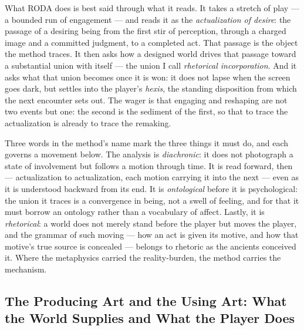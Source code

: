 \documentclass{article}
\begin{document}
What RODA does is best said through what it reads. It takes a stretch of play — a bounded run of engagement — and reads it as the \textit{actualization of desire}: the passage of a desiring being from the first stir of perception, through a charged image and a committed judgment, to a completed act. That passage is the object the method traces. It then asks how a designed world drives that passage toward a substantial union with itself — the union I call \textit{rhetorical incorporation}. And it asks what that union becomes once it is won: it does not lapse when the screen goes dark, but settles into the player's \textit{hexis}, the standing disposition from which the next encounter sets out. The wager is that engaging and reshaping are not two events but one: the second is the sediment of the first, so that to trace the actualization is already to trace the remaking.

Three words in the method's name mark the three things it must do, and each governs a movement below. The analysis is \textit{diachronic}: it does not photograph a state of involvement but follows a motion through time. It is read forward, then — actualization to actualization, each motion carrying it into the next — even as it is understood backward from its end. It is \textit{ontological} before it is psychological: the union it traces is a convergence in being, not a swell of feeling, and for that it must borrow an ontology rather than a vocabulary of affect. Lastly, it is \textit{rhetorical}: a world does not merely stand before the player but moves the player, and the grammar of such moving — how an act is given its motive, and how that motive's true source is concealed — belongs to rhetoric as the ancients conceived it. Where the metaphysics carried the reality-burden, the method carries the mechanism.

\subsection*{The Producing Art and the Using Art: What the World Supplies and What the Player Does}
\end{document}
